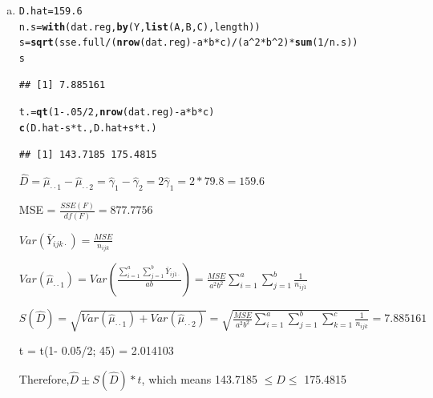 \documentclass{article}\usepackage[]{graphicx}\usepackage[]{color}
\makeatletter
\newcommand{\hlnum}[1]{\textcolor[rgb]{0.686,0.059,0.569}{#1}}%
\newcommand{\hlopt}[1]{\textcolor[rgb]{0,0,0}{#1}}%
\newcommand{\hlstd}[1]{\textcolor[rgb]{0.345,0.345,0.345}{#1}}%
\newcommand{\hlkwb}[1]{\textcolor[rgb]{0.69,0.353,0.396}{#1}}%
\newcommand{\hlkwd}[1]{\textcolor[rgb]{0.737,0.353,0.396}{\textbf{#1}}}%
\newenvironment{kframe}{%
 \def\at@end@of@kframe{}%
 \ifinner\ifhmode%
  \def\at@end@of@kframe{\end{minipage}}%
  \begin{minipage}{\columnwidth}%
 \fi\fi%
 \def\FrameCommand##1{\hskip\@totalleftmargin \hskip-\fboxsep
 \colorbox{shadecolor}{##1}\hskip-\fboxsep
     \hskip-\linewidth \hskip-\@totalleftmargin \hskip\columnwidth}%
 \MakeFramed {\advance\hsize-\width
   \@totalleftmargin\z@ \linewidth\hsize
   \@setminipage}}%
 {\par\unskip\endMakeFramed%
 \at@end@of@kframe}
\newenvironment{knitrout}{}{} %
\makeatother
\begin{document}
\begin{enumerate}[(a)]
\item

\begin{knitrout}
\color{fgcolor}\begin{kframe}
\begin{alltt}
  \hlstd{D.hat} \hlkwb{=} \hlnum{159.6}
  \hlstd{n.s} \hlkwb{=} \hlkwd{with}\hlstd{(dat.reg,} \hlkwd{by}\hlstd{(Y,} \hlkwd{list}\hlstd{(A, B, C), length))}
  \hlstd{s} \hlkwb{=} \hlkwd{sqrt}\hlstd{(sse.full}\hlopt{/}\hlstd{(}\hlkwd{nrow}\hlstd{(dat.reg)} \hlopt{-} \hlstd{a}\hlopt{*}\hlstd{b}\hlopt{*}\hlstd{c)} \hlopt{/} \hlstd{(a}\hlopt{^}\hlnum{2}\hlopt{*}\hlstd{b}\hlopt{^}\hlnum{2}\hlstd{)} \hlopt{*} \hlkwd{sum}\hlstd{(}\hlnum{1}\hlopt{/}\hlstd{n.s))}
  \hlstd{s}
\end{alltt}
\begin{verbatim}
## [1] 7.885161
\end{verbatim}
\begin{alltt}
  \hlstd{t.} \hlkwb{=} \hlkwd{qt}\hlstd{(}\hlnum{1} \hlopt{-} \hlnum{.05}\hlopt{/}\hlnum{2}\hlstd{,} \hlkwd{nrow}\hlstd{(dat.reg)} \hlopt{-} \hlstd{a}\hlopt{*}\hlstd{b}\hlopt{*}\hlstd{c)}
  \hlkwd{c}\hlstd{(D.hat} \hlopt{-} \hlstd{s}\hlopt{*}\hlstd{t., D.hat} \hlopt{+} \hlstd{s}\hlopt{*}\hlstd{t.)}
\end{alltt}
\begin{verbatim}
## [1] 143.7185 175.4815
\end{verbatim}
\end{kframe}
\end{knitrout}

$\hat{D} = \hat{\mu}_{\cdot \cdot 1} - \hat{\mu}_{\cdot \cdot 2}= \hat{\gamma}_1 - \hat{\gamma}_2 = 2\hat{\gamma}_1=2*79.8=159.6$

MSE = $\frac{SSE(F)}{df(F)} = 877.7756$

$Var(\bar{Y}_{ijk\cdot}) = \frac{MSE}{n_{ijk}}$

$Var(\hat{\mu}_{\cdot \cdot 1}) = Var(\frac{\sum_{i=1}^a\sum_{j=1}^b \bar{Y}_{ij1\cdot}}{ab}) = \frac{MSE}{a^2b^2} \sum_{i=1}^a\sum_{j=1}^b \frac{1}{n_{ij1}}$

$S(\hat{D}) = \sqrt{Var(\hat{\mu}_{\cdot \cdot 1})+Var(\hat{\mu}_{\cdot \cdot 2})} = \sqrt{\frac{MSE}{a^2b^2} \sum_{i=1}^a\sum_{j=1}^b\sum_{k=1}^c \frac{1}{n_{ijk}}} = 7.885161$

t = t(1- 0.05/2; 45) = 2.014103

Therefore,$\hat{D} \pm S(\hat{D})*t$, which means 143.7185 $\leq D \leq$ 175.4815

\end{enumerate}
\end{document}
